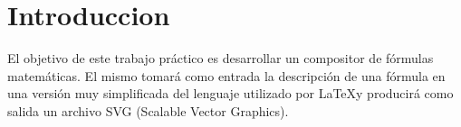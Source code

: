 \section{Introduccion}
El objetivo de este trabajo práctico es desarrollar un compositor de fórmulas matemáticas. El mismo tomará como entrada la descripción de una fórmula en una versión muy simplificada del lenguaje utilizado por \LaTeX \hspace{0.1cm}y producirá como salida un archivo SVG (Scalable Vector Graphics).